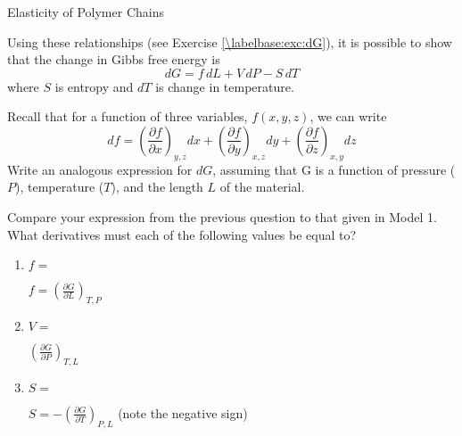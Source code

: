 \begin{activity}{Elasticity of Polymer Chains}
\begin{model}
	Using these relationships (see Exercise \ref{\labelbase:exc:dG}), it is possible to show that the change in Gibbs free energy is
	\begin{equation*}
		dG = f\,dL + V\,dP - S\,dT
	\end{equation*}
	where $S$ is entropy and $dT$ is change in temperature.

\end{model}


\begin{ctqs}

	\question Recall that for a function of three variables, $f(x,y,z)$, we can write
		\begin{equation*}
			df = \left(\frac{\partial f}{\partial x}\right)_{y,z}dx + 
				\left(\frac{\partial f}{\partial y}\right)_{x,z}dy +
				\left(\frac{\partial f}{\partial z}\right)_{x,y}dz
		\end{equation*}
		Write an analogous expression for $dG$, assuming that G is a function of pressure ($P$), temperature ($T$), and the length $L$ of the material.
		
		\begin{solution}[1in]\end{solution}
		
	\question Compare your expression from the previous question to that given in Model 1.  What derivatives must each of the following values be equal to?
	
		\begin{enumerate}
			\item $f=$ \label{\labelbase:ctq:fderiv}
				\begin{solution}[0.5in]
					$f = \left(\frac{\partial G}{\partial L}\right)_{T,P}$
				\end{solution}
			\item $V=$
				\begin{solution}[0.5in]
					$\left(\frac{\partial G}{\partial P}\right)_{T,L}$
				\end{solution}
			\item $S=$
				\begin{solution}[0.5in]
					$S=  -\left(\frac{\partial G}{\partial T}\right)_{P,L}$ (note the negative sign)
				\end{solution}
		\end{enumerate}
		

\end{ctqs}
\end{activity}
